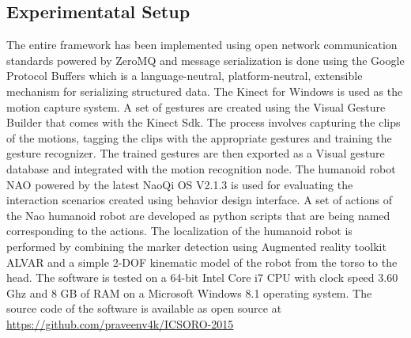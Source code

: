 \documentclass{llncs}
\begin{document}
\subsection{Experimentatal Setup}
The entire framework has been implemented using open network communication standards powered by ZeroMQ\cite{ZeroMQ} and message serialization is done using the Google Protocol Buffers\cite{ProtocolBuffers} which is a language-neutral, platform-neutral, extensible mechanism for serializing structured data. The Kinect for Windows is used as the motion capture system. A set of gestures are created using the Visual Gesture Builder that comes with the Kinect Sdk\cite{Kinect2014}. The process involves capturing the clips of the motions, tagging the clips with the appropriate gestures and training the gesture recognizer. The trained gestures are then exported as a Visual gesture database and integrated with the motion recognition node. The humanoid robot NAO powered by the latest NaoQi OS V2.1.3 is used for evaluating the interaction scenarios created using behavior design interface.  A set of actions of the Nao humanoid robot are developed as python scripts that are being named corresponding to the actions. The localization of the humanoid robot is performed by combining the marker detection using Augmented reality toolkit ALVAR\cite{ALVAR} and a simple 2-DOF kinematic model of the robot from the torso to the head. The software is tested on a 64-bit Intel Core i7 CPU with clock speed 3.60 Ghz and 8 GB of RAM on a  Microsoft Windows 8.1 operating system. The source code of the software is available as open source at \url{https://github.com/praveenv4k/ICSORO-2015}
\end{document}

